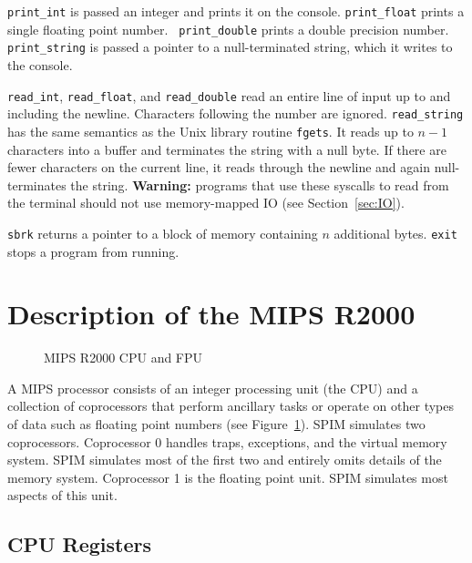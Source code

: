 {\tt print\_int} is passed an integer and prints it on the console.
{\tt print\_float} prints a single floating point number. {\tt
print\_double} prints a double precision number.  {\tt print\_string}
is passed a pointer to a null-terminated string, which it writes to
the console.

{\tt read\_int}, {\tt read\_float}, and {\tt read\_double} read an
entire line of input up to and including the newline.  Characters
following the number are ignored.  {\tt read\_string} has the same
semantics as the Unix library routine {\tt fgets}.  It reads up to
$n-1$ characters into a buffer and terminates the string with a null
byte.  If there are fewer characters on the current line, it reads
through the newline and again null-terminates the string.  {\bf
Warning:} programs that use these syscalls to read from the terminal
should not use memory-mapped IO (see Section~\ref{sec:IO}).

{\tt sbrk} returns a pointer to a block of memory containing $n$
additional bytes.  {\tt exit} stops a program from running.

\section{Description of the MIPS R2000}
\label{sec:mips}

\begin{figure}
  \centerline{}
  \caption{MIPS R2000 CPU and FPU}
  \label{fig:mips}
\end{figure}
A MIPS processor consists of an integer processing unit (the CPU) and
a collection of coprocessors that perform ancillary tasks or operate
on other types of data such as floating point numbers (see
Figure~\ref{fig:mips}).  SPIM simulates two coprocessors.  Coprocessor
0 handles traps, exceptions, and the virtual memory system.  SPIM
simulates most of the first two and entirely omits details of the
memory system.  Coprocessor 1 is the floating point unit.  SPIM
simulates most aspects of this unit.

\subsection{CPU Registers}

